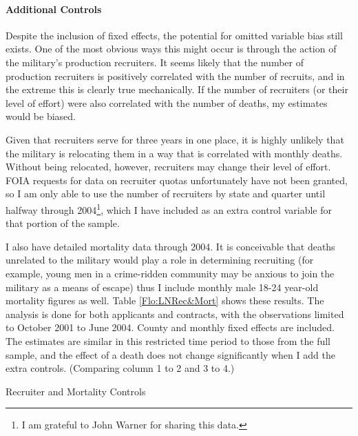 \documentclass[12pt] {article}
\begin{document}
\paragraph{Additional Controls}

Despite the inclusion of fixed effects, the potential for omitted
variable bias still exists. One of the most obvious ways this might
occur is through the action of the military's production recruiters.
It seems likely that the number of production recruiters is positively
correlated with the number of recruits, and in the extreme this is
clearly true mechanically. If the number of recruiters (or their level
of effort) were also correlated with the number of deaths, my estimates
would be biased. 

Given that recruiters serve for three years in one
place, it is highly unlikely that the military is relocating them
in a way that is correlated with monthly deaths. Without being relocated,
however, recruiters may change their level of effort. FOIA requests for data on recruiter quotas unfortunately have not been granted, so I am only able to use the number of recruiters by state and quarter until halfway through 2004\footnote{I am grateful to John Warner for sharing this data.}, which I have included as an extra control variable for that portion of the sample. 

I also have detailed mortality data through 2004. It is conceivable that deaths unrelated to the military would play a role in determining recruiting (for example,
young men in a crime-ridden community may be anxious to join the military
as a means of escape) thus I include monthly male 18-24 year-old mortality figures
as well. Table \ref{Flo:LNRec&Mort} shows these results. The
analysis is done for both applicants and contracts, with the observations
limited to October 2001 to June 2004. County and monthly
fixed effects are included. The estimates are similar in this restricted time period to those from the full sample, and the effect of a death does not change significantly when I add the extra controls. (Comparing column 1 to 2 and 3 to 4.)  %

\begin{table}
\caption{Recruiter and Mortality Controls}
\label{Flo:LNRec&Mort}
\end{table}
\end{document}
